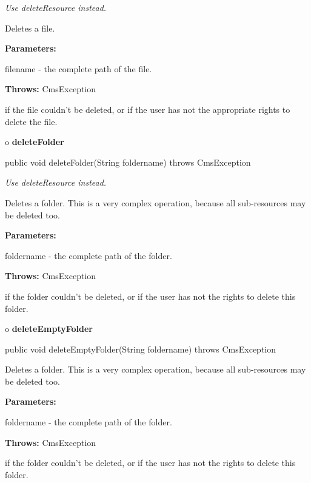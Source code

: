 \begin{description}
 {\it Use deleteResource
instead.} 

Deletes a file. 

\begin{description}
\item {\bf Parameters:}  

filename - the complete path of the file.  
\item {\bf Throws:} CmsException  

if the file couldn't be deleted, or if the user has not the appropriate rights
to delete the file.  
\end{description}

\end{description}

o {\bf deleteFolder} 

\begin{PRE}
 public void deleteFolder(String foldername) throws CmsException
\end{PRE}

\begin{description}
 {\it Use deleteResource
instead.} 

Deletes a folder. \htmlBR
This is a very complex operation, because all sub-resources may be deleted
too. 

\begin{description}
\item {\bf Parameters:}  

foldername - the complete path of the folder.  
\item {\bf Throws:} CmsException  

if the folder couldn't be deleted, or if the user has not the rights to delete
this folder.  
\end{description}

\end{description}

o {\bf deleteEmptyFolder} 

\begin{PRE}
 public void deleteEmptyFolder(String foldername) throws CmsException
\end{PRE}

\begin{description}
\htmlDD Deletes a folder. \htmlBR
This is a very complex operation, because all sub-resources may be deleted
too. 

\begin{description}
\item {\bf Parameters:}  

foldername - the complete path of the folder.  
\item {\bf Throws:} CmsException  

if the folder couldn't be deleted, or if the user has not the rights to delete
this folder.  
\end{description}

\end{description}

